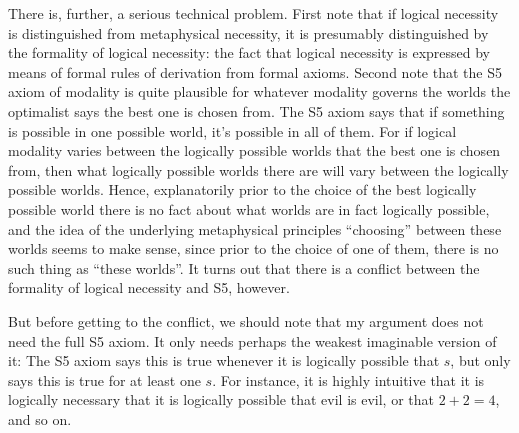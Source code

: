 There is, further, a serious technical problem. First note that if logical necessity is distinguished from metaphysical necessity, it is presumably distinguished by the formality of logical necessity: the fact that logical necessity is expressed by means of 
formal rules of derivation from formal axioms. Second note that the S5 axiom of modality is quite plausible for whatever
modality governs the worlds the optimalist says the best one is chosen from. The S5 axiom says that if something is possible 
in one possible world, it's possible in all of them. For if logical modality varies between the logically possible worlds that
the best one is chosen from, then what logically possible worlds there are will vary between the logically possible worlds. Hence, explanatorily prior to the choice of the best logically possible world there is no fact about what worlds are in fact logically possible, and the idea of the underlying metaphysical principles ``choosing'' between these worlds seems to make sense, since 
prior to the choice of one of them, there is no such thing as ``these worlds''. It turns out that there is a conflict between 
the formality of logical necessity and S5, however.

But before getting to the conflict, we should note that my argument does not need the full S5 axiom. It only needs 
perhaps the weakest imaginable version of it:
The S5 axiom says this is true whenever it is logically possible that $s$, but  only says this is true 
for at least one $s$. For instance, it is highly intuitive that it is logically necessary that it is logically possible 
that evil is evil, or that $2+2=4$, and so on.

